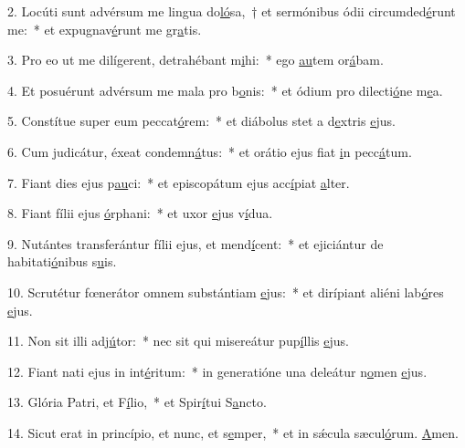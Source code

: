 2. Locúti sunt advérsum me lingua do\uline{ló}sa,~† et sermónibus ódii circumded\uline{é}runt me:~* et expugnav\uline{é}runt me gr\uline{a}tis.\par 
3. Pro eo ut me dilígerent, detrahébant m\uline{i}hi:~* ego \uline{au}tem or\uline{á}bam.\par 
4. Et posuérunt advérsum me mala pro b\uline{o}nis:~* et ódium pro dilecti\uline{ó}ne m\uline{e}a.\par 
5. Constítue super eum peccat\uline{ó}rem:~* et diábolus stet a d\uline{e}xtris \uline{e}jus.\par 
6. Cum judicátur, éxeat condemn\uline{á}tus:~* et orátio ejus fiat \uline{i}n pecc\uline{á}tum.\par 
7. Fiant dies ejus p\uline{au}ci:~* et episcopátum ejus acc\uline{í}piat \uline{a}lter.\par 
8. Fiant fílii ejus \uline{ó}rphani:~* et uxor \uline{e}jus v\uline{í}dua.\par 
9. Nutántes transferántur fílii ejus, et mend\uline{í}cent:~* et ejiciántur de habitati\uline{ó}nibus s\uline{u}is.\par 
10. Scrutétur fœnerátor omnem substántiam \uline{e}jus:~* et dirípiant aliéni lab\uline{ó}res \uline{e}jus.\par 
11. Non sit illi adj\uline{ú}tor:~* nec sit qui misereátur pup\uline{í}llis \uline{e}jus.\par 
12. Fiant nati ejus in int\uline{é}ritum:~* in generatióne una deleátur n\uline{o}men \uline{e}jus.\par 
13. Glória Patri, et F\uline{í}lio,~* et Spir\uline{í}tui S\uline{a}ncto.\par 
14. Sicut erat in princípio, et nunc, et s\uline{e}mper,~* et in sǽcula sæcul\uline{ó}rum. \uline{A}men.\par 
